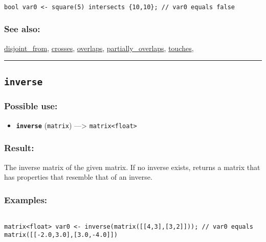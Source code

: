 \documentclass[]{book}
\providecommand{\tightlist}{%
  \setlength{\itemsep}{0pt}\setlength{\parskip}{0pt}}
\theoremstyle{definition}
\theoremstyle{definition}
\theoremstyle{definition}
\theoremstyle{remark}
\begin{document}
\begin{verbatim}
 
bool var0 <- square(5) intersects {10,10}; // var0 equals false
\end{verbatim}

\subsubsection{See also:}\label{see-also-121}

\href{OperatorsDH\#disjoint_from}{disjoint\_from},
\href{OperatorsBC\#crosses}{crosses},
\href{OperatorsNR\#overlaps}{overlaps},
\href{OperatorsNR\#partially_overlaps}{partially\_overlaps},
\href{OperatorsSZ\#touches}{touches},

\begin{center}\rule{0.5\linewidth}{\linethickness}\end{center}

\subsection{\texorpdfstring{\texttt{inverse}}{inverse}}\label{inverse}

\subsubsection{Possible use:}\label{possible-use-283}

\begin{itemize}
\tightlist
\item
  \textbf{\texttt{inverse}} (\texttt{matrix}) ---\textgreater{}
  \texttt{matrix\textless{}float\textgreater{}}
\end{itemize}

\subsubsection{Result:}\label{result-273}

The inverse matrix of the given matrix. If no inverse exists, returns a
matrix that has properties that resemble that of an inverse.

\subsubsection{Examples:}\label{examples-213}

\begin{verbatim}
 
matrix<float> var0 <- inverse(matrix([[4,3],[3,2]])); // var0 equals matrix([[-2.0,3.0],[3.0,-4.0]])
\end{verbatim}
\end{document}
